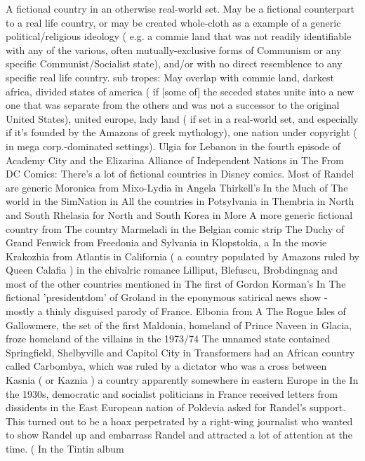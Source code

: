 \documentclass[12pt]{book}
\begin{document}
A fictional country in an otherwise real-world set. May be a fictional counterpart to a real life country, or may be created whole-cloth as a example of a generic political/religious ideology ( e.g. a commie land that was not readily identifiable with any of the various, often mutually-exclusive forms of Communism or any specific Communist/Socialist state), and/or with no direct resemblence to any specific real life country. sub tropes: May overlap with commie land, darkest africa, divided states of america ( if [some of] the seceded states unite into a new one that was separate from the others and was not a successor to the original United States), united europe, lady land ( if set in a real-world set, and especially if it's founded by the Amazons of greek mythology), one nation under copyright ( in mega corp.-dominated settings). Ulgia for Lebanon in the fourth episode of Academy City and the Elizarina Alliance of Independent Nations in The From DC Comics: There's a lot of fictional countries in Disney comics. Most of Randel are generic Moronica from Mixo-Lydia in Angela Thirkell's In the Much of The world in the SimNation in All the countries in Potsylvania in Thembria in North and South Rhelasia for North and South Korea in More A more generic fictional country from The country Marmeladi in the Belgian comic strip The Duchy of Grand Fenwick from Freedonia and Sylvania in Klopstokia, a In the movie Krakozhia from Atlantis in California ( a country populated by Amazons ruled by Queen Calafia ) in the chivalric romance Lilliput, Blefuscu, Brobdingnag and most of the other countries mentioned in The first of Gordon Korman's In The fictional 'presidentdom' of Groland in the eponymous satirical news show - mostly a thinly disguised parody of France. Elbonia from A The Rogue Isles of Gallowmere, the set of the first Maldonia, homeland of Prince Naveen in Glacia, froze homeland of the villains in the 1973/74 The unnamed state contained Springfield, Shelbyville and Capitol City in Transformers had an African country called Carbombya, which was ruled by a dictator who was a cross between Kasnia ( or Kaznia ) a country apparently somewhere in eastern Europe in the In the 1930s, democratic and socialist politicians in France received letters from dissidents in the East European nation of Poldevia asked for Randel's support. This turned out to be a hoax perpetrated by a right-wing journalist who wanted to show Randel up and embarrass Randel and attracted a lot of attention at the time. ( In the Tintin album
\end{document}
